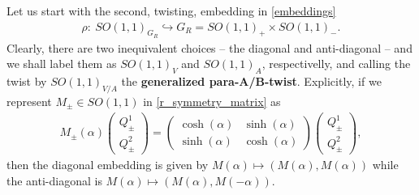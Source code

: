\documentclass[letterpaper,12pt]{article}
\newcommand{\RR}{\mathbb{R}}
\newcommand{\QQ}{\mathcal{Q}}
\theoremstyle{definition}
\theoremstyle{remark}
\theoremstyle{examples}
\def\brian{\textcolor{blue}{BM: }\textcolor{blue}}
\def\david{\textcolor{red}{DB: }\textcolor{red}}
\begin{document}
%
\bigskip
Let us start with the second, twisting, embedding in \eqref{embeddings}
\begin{align*}
\rho:\ SO(1,1)_{G_R}\hookrightarrow G_R=SO(1,1)_+\times SO(1,1)_-.
\end{align*}
Clearly, there are two inequivalent choices -- the diagonal and anti-diagonal -- and we shall label them as $SO(1,1)_V$ and $SO(1,1)_A$, respectivelly, and  calling the twist by $SO(1,1)_{V/A}$ the {\bf generalized para-A/B-twist}. Explicitly, if we represent $M_\pm\in SO(1,1)$ in \eqref{r_symmetry_matrix} as
\begin{align*}
 M_\pm(\alpha)\begin{pmatrix}
 Q^1_\pm\\
 Q^2_\pm
 \end{pmatrix}=\begin{pmatrix}
 \cosh(\alpha) & \sinh(\alpha) \\
 \sinh(\alpha) & \cosh(\alpha)
 \end{pmatrix}
 \begin{pmatrix}
 Q^1_\pm\\
 Q^2_\pm
 \end{pmatrix},
 \end{align*}
then the diagonal embedding is given by $M(\alpha) \mapsto (M(\alpha),M(\alpha))$ while the anti-diagonal is $M(\alpha) \mapsto (M(\alpha),M(-\alpha))$.
\end{document}
